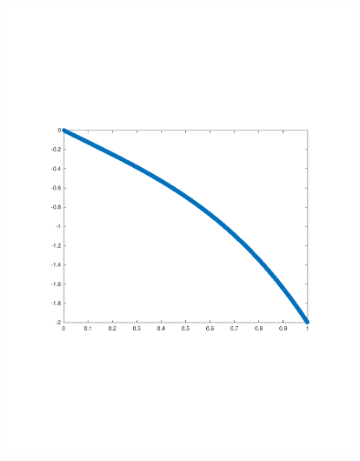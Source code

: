 \documentclass{article}
\begin{document}
\begin{figure}[H]
\begin{subfigure}{0.48\textwidth}
\includegraphics[width=\linewidth]{gaussian_lambda_2}
\end{subfigure}\hspace*{\fill}


\end{figure}
\end{document}
